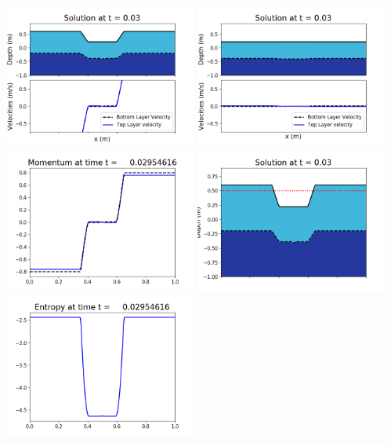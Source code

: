 \documentclass[11pt]{article}
\begin{document}
\vskip 10pt 
\includegraphics[width=0.475\textwidth]{frame0082fig1001.png}
\includegraphics[width=0.475\textwidth]{frame0082fig1002.png}
\vskip 10pt 
\includegraphics[width=0.475\textwidth]{frame0082fig1003.png}
\includegraphics[width=0.475\textwidth]{frame0082fig1006.png}
\vskip 10pt 
\includegraphics[width=0.475\textwidth]{frame0082fig1007.png}
\end{document}
